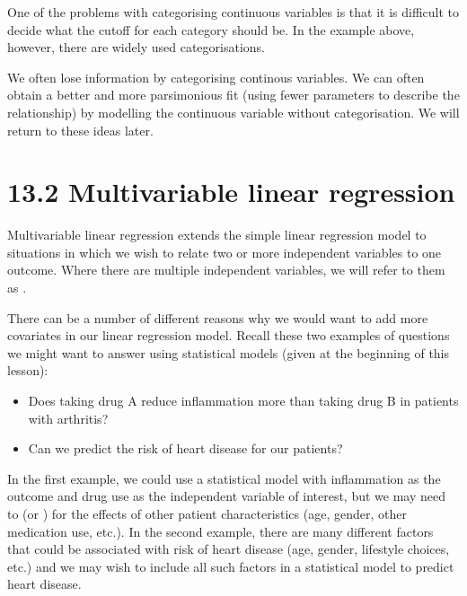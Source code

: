 \documentclass[letterpaper,10pt,english]{jupyterBook}
\begin{document}
\sphinxAtStartPar
One of the problems with categorising continuous variables is that it is difficult to decide what the cut\sphinxhyphen{}off for each category should be. In the example above, however, there are widely used categorisations.

\sphinxAtStartPar
We often lose information by categorising continous variables. We can often obtain a better and more parsimonious fit (using fewer parameters to describe the relationship) by modelling the continuous variable without categorisation. We will return to these ideas later.


\section{13.2 Multivariable linear regression}
\label{\detokenize{13.c. Linear Regression II:multivariable-linear-regression}}\label{\detokenize{13.c. Linear Regression II::doc}}
\sphinxAtStartPar
Multivariable linear regression extends the simple linear regression model to situations in which we wish to relate two or more independent variables to one outcome. Where there are multiple independent variables, we will refer to them as .

\sphinxAtStartPar
There can be a number of different reasons why we would want to add more covariates in our linear regression model. Recall these two examples of questions we might want to answer using statistical models (given at the beginning of this lesson):
\begin{itemize}
\item {} 
\sphinxAtStartPar
Does taking drug A reduce inflammation more than taking drug B in patients with arthritis?

\item {} 
\sphinxAtStartPar
Can we predict the risk of heart disease for our patients?

\end{itemize}

\sphinxAtStartPar
In the first example, we could use a statistical model with inflammation as the outcome and drug use as the independent variable of interest, but we may need to  (or ) for the  effects of other patient characteristics (age, gender, other medication use, etc.). In the second example, there are many different factors that could be associated with risk of heart disease (age, gender, lifestyle choices, etc.) and we may wish to include all such factors in a statistical model to predict heart disease.
\end{document}
